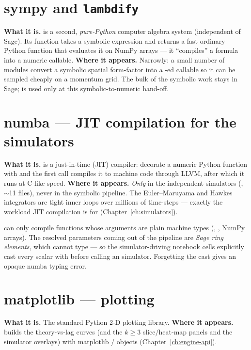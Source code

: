\section{sympy and \texttt{lambdify}}
\textbf{What it is.}   is a second, \emph{pure-Python} computer
algebra system (independent of Sage).  Its  function takes a
symbolic expression and returns a fast ordinary Python function that evaluates it
on NumPy arrays --- it ``compiles'' a formula into a numeric callable.
\textbf{Where it appears.}  Narrowly: a small number of modules convert a
symbolic spatial form-factor into a -ed callable so it can be
sampled cheaply on a momentum grid.  The bulk of the symbolic work stays in
Sage;  is used only at this symbolic-to-numeric hand-off.

\section{numba --- JIT compilation for the simulators}
\textbf{What it is.}   is a just-in-time (JIT) compiler: decorate a
numeric Python function with  and the first call compiles it to
machine code through LLVM, after which it runs at C-like speed.
\textbf{Where it appears.}  \emph{Only} in the independent simulators
(, $\sim$11 files), never in the symbolic pipeline.  The
Euler--Maruyama and Hawkes integrators are tight inner loops over millions of
time-steps --- exactly the workload JIT compilation is for
(Chapter~\ref{ch:simulators}).

\begin{gotcha}
 can only compile functions whose arguments are plain machine types
(, , NumPy arrays).  The resolved parameters coming out of
the pipeline are \emph{Sage ring elements}, which  cannot type ---
so the simulator-driving notebook cells explicitly cast every scalar with
 before calling an  simulator.  Forgetting the cast
gives an opaque numba typing error.
\end{gotcha}

\section{matplotlib --- plotting}
\textbf{What it is.}  The standard Python 2-D plotting library.
\textbf{Where it appears.}   builds the theory-vs-lag
curves (and the $k\!\ge\!3$ slice/heat-map panels and the simulator overlays)
with matplotlib / objects
(Chapter~\ref{ch:engine-api}).

